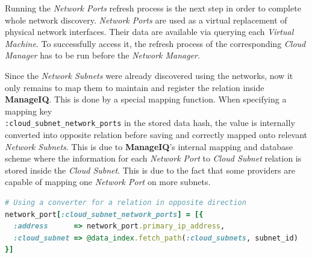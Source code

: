 Running the \emph{Network Ports} refresh process is the next step in order to complete whole network discovery. \emph{Network Ports} are used as a virtual replacement of physical network interfaces. Their data are available via querying each \emph{Virtual Machine}. To successfully access it, the refresh process of the corresponding \emph{Cloud Manager} has to be run before the \emph{Network Manager}.

Since the \emph{Network Subnets} were already discovered using the networks, now it only remains to map them to maintain and register the relation inside \textbf{ManageIQ}. This is done by a special mapping function. When specifying a mapping key \\ \verb|:cloud_subnet_network_ports| in the stored data hash, the value is internally converted into opposite relation before saving and correctly mapped onto relevant \emph{Network Subnets}. This is due to \textbf{ManageIQ}'s internal mapping and database scheme where the information for each \emph{Network Port} to \emph{Cloud Subnet} relation is stored inside the \emph{Cloud Subnet}. This is due to the fact that some providers are capable of mapping one \emph{Network Port} on more subnets.

\begin{lstlisting}[language=Ruby,caption={\emph{Network port} to \emph{Cloud subnet} mapping},label=code:port_to_subnet,float=ht]
# Using a converter for a relation in opposite direction
network_port[:cloud_subnet_network_ports] = [{
  :address      => network_port.primary_ip_address,
  :cloud_subnet => @data_index.fetch_path(:cloud_subnets, subnet_id)
}]
\end{lstlisting}

